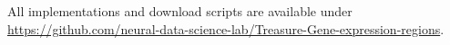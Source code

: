 \documentclass[]{article}
\renewcommand{\cite}{\citep}
\newcommand{\Github}{https://github.com/neural-data-science-lab/Treasure-Gene-expression-regions}
\begin{document}
All implementations and download scripts are available under \href{\Github}{\Github}.


%	
%
%
\end{document}
